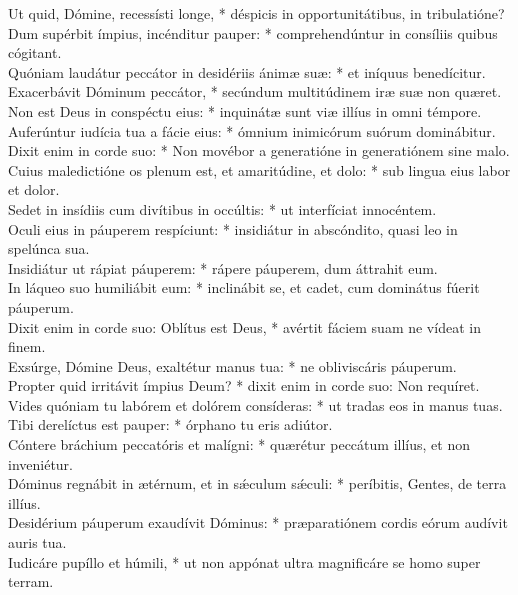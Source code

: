 {	Ut quid, Dómine, recessísti longe, * déspicis in opportunitátibus, in tribulatióne? \\
	Dum supérbit ímpius, incénditur pauper: * comprehendúntur in consíliis quibus cógitant. \\
	Quóniam laudátur peccátor in desidériis ánimæ suæ: * et iníquus benedícitur. \\
	Exacerbávit Dóminum peccátor, * secúndum multitúdinem iræ suæ non quæret. \\
	Non est Deus in conspéctu eius: * inquinátæ sunt viæ illíus in omni témpore. \\
	Auferúntur iudícia tua a fácie eius: * ómnium inimicórum suórum dominábitur. \\
	Dixit enim in corde suo: * Non movébor a generatióne in generatiónem sine malo. \\
	Cuius maledictióne os plenum est, et amaritúdine, et dolo: * sub lingua eius labor et dolor. \\
	Sedet in insídiis cum divítibus in occúltis: * ut interfíciat innocéntem. \\
	Oculi eius in páuperem respíciunt: * insidiátur in abscóndito, quasi leo in spelúnca sua. \\
	Insidiátur ut rápiat páuperem: * rápere páuperem, dum áttrahit eum. \\
	In láqueo suo humiliábit eum: * inclinábit se, et cadet, cum dominátus fúerit páuperum. \\
	Dixit enim in corde suo: Oblítus est Deus, * avértit fáciem suam ne vídeat in finem. \\
	Exsúrge, Dómine Deus, exaltétur manus tua: * ne obliviscáris páuperum. \\
	Propter quid irritávit ímpius Deum? * dixit enim in corde suo: Non requíret. \\
	Vides quóniam tu labórem et dolórem consíderas: * ut tradas eos in manus tuas. \\
	Tibi derelíctus est pauper: * órphano tu eris adiútor. \\
	Cóntere bráchium peccatóris et malígni: * quærétur peccátum illíus, et non inveniétur. \\
	Dóminus regnábit in ætérnum, et in sǽculum sǽculi: * períbitis, Gentes, de terra illíus. \\
	Desidérium páuperum exaudívit Dóminus: * præparatiónem cordis eórum audívit auris tua. \\
	Iudicáre pupíllo et húmili, * ut non appónat ultra magnificáre se homo super terram.
}

